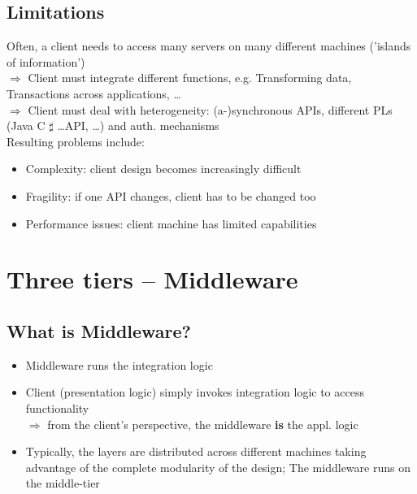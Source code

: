 		\subsection{Limitations}
			Often, a client needs to access many servers on many different machines ('islands of information')\\
			$ \Rightarrow $ Client must integrate different functions, e.g. Transforming data, Transactions across applications, \ldots\\
			$ \Rightarrow $ Client must deal with heterogeneity: (a-)synchronous APIs, different PLs (Java C $ \sharp $ \ldots API, \ldots) and auth. mechanisms\\
			Resulting problems include:
			\begin{itemize}
				\item Complexity: client design becomes increasingly difficult
				\item Fragility: if one API changes, client has to be changed too
				\item Performance issues: client machine has limited capabilities
			\end{itemize}
		
			
			\pagebreak %
		
	\section{Three tiers -- Middleware}
		\subsection{What is Middleware?}
			\begin{itemize}
				\item Middleware runs the integration logic
				\item Client (presentation logic) simply invokes integration logic to access functionality\\
					$ \Rightarrow $ from the client's perspective, the middleware \textbf{is} the appl. logic
				\item Typically, the layers are distributed across different machines taking advantage of the complete modularity of the design; The middleware runs on the middle-tier
			\end{itemize}
			

